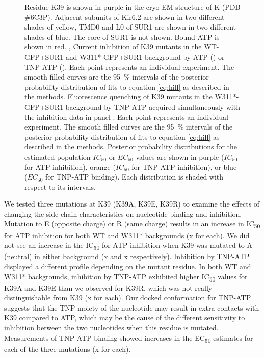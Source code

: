 \begin{figure}[h]
{	 Residue K39 is shown in purple in the cryo-EM structure of K\ATP{} (PDB \#6C3P).
	Adjacent subunits of Kir6.2 are shown in two different shades of yellow, TMD0 and L0 of SUR1 are shown in two different shades of blue.
	The core of SUR1 is not shown.
	Bound ATP is shown in red.
	,  Current inhibition of K39 mutants in the WT-GFP+SUR1 and W311*-GFP+SUR1 background by ATP () or TNP-ATP ().
	Each point represents an individual experiment.
	The smooth filled curves are the \SI{95}{\percent} intervals of the posterior probability distribution of fits to equation \ref{eq:hill} as described in the methods.
	 Fluorescence quenching of K39 mutants in the W311*-GFP+SUR1 background by TNP-ATP acquired simultaneously with the inhibition data in panel .
	Each point represents an individual experiment.
	The smooth filled curves are the \SI{95}{\percent} intervals of the posterior probability distribution of fits to equation \ref{eq:hill} as described in the methods.
	 Posterior probability distributions for the estimated population $IC_{50}$ or $EC_{50}$ values are shown in purple ($IC_{50}$ for ATP inhibition), orange ($IC_{50}$ for TNP-ATP inhibition), or blue ($EC_{50}$ for TNP-ATP binding).
	Each distribution is shaded with respect to its intervals.
	}\label{ch5fig:k39_1}
\end{figure}

We tested three mutations at K39 (K39A, K39E, K39R) to examine the effects of changing the side chain characteristics on nucleotide binding and inhibition.
Mutation to E (opposite charge) or R (same charge) results in an increase in IC\textsubscript{50} for ATP inhibition for both WT and W311* backgrounds (x for each).
We did not see an increase in the IC\textsubscript{50} for ATP inhibition when K39 was mutated to A (neutral) in either background (x and x respectively).
Inhibition by TNP-ATP displayed a different profile depending on the mutant residue.
In both WT and W311* backgrounds, inhibition by TNP-ATP exhibited higher IC\textsubscript{50} values for K39A and K39E than we observed for K39R, which was not really distinguishable from K39 (x for each).
Our docked conformation for TNP-ATP suggests that the TNP-moiety of the nucleotide may result in extra contacts with K39 compared to ATP, which may be the cause of the different sensitivity to inhibition between the two nucleotides when this residue is mutated.
Measurements of TNP-ATP binding showed increases in the EC\textsubscript{50} estimates for each of the three mutations (x for each).


